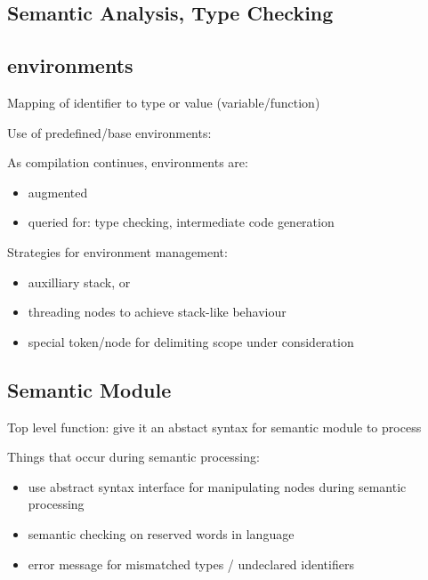 \documentclass[8pt]{extarticle}
\begin{document}
\begin{multicols*}{2}
  \vfill\null
  \columnbreak

  \section{Semantic Analysis, Type Checking}
  \subsection{environments}
  Mapping of identifier to type or value (variable/function)

  Use of predefined/base environments:

  As compilation continues, environments are:
  \begin{itemize}
  \item augmented
  \item queried for: type checking, intermediate code generation
  \end{itemize}

  Strategies for environment management:
  \begin{itemize}
  \item auxilliary stack, or
  \item threading nodes to achieve stack-like behaviour
  \item special token/node for delimiting scope under consideration
  \end{itemize}

  \subsection{Semantic Module}

  Top level function: give it an abstact syntax for semantic module to process

  Things that occur during semantic processing:
  \begin{itemize}
  \item use abstract syntax interface for manipulating nodes during semantic processing
  \item semantic checking on reserved words in language
  \item error message for mismatched types / undeclared identifiers
  \end{itemize}
    

\end{multicols*}
\end{document}

